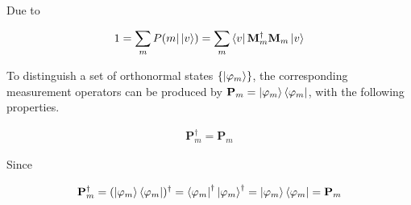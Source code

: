 Due to

\begin{align*}
    1 = \sum\limits_{m} P(m | \ket{v}) = \sum\limits_{m} \bra{v} \mathbf{M}_m^{\dagger} \mathbf{M}_m \ket{v}
\end{align*}


To distinguish a set of orthonormal states $\{\ket{\varphi_m}\}$, the corresponding measurement operators can be produced by $\mathbf{P}_m = \ket{\varphi_m}\bra{\varphi_m}$, with the following properties.

\begin{property}

\begin{align*}
\mathbf{P}_m^{\dagger} = \mathbf{P}_m
\end{align*}

Since

\begin{align*}
\mathbf{P}_m^{\dagger} =
(\ket{\varphi_m}\bra{\varphi_m})^{\dagger} =
\bra{\varphi_m}^{\dagger}\ket{\varphi_m}^{\dagger} =
\ket{\varphi_m}\bra{\varphi_m} =
\mathbf{P}_m
\end{align*}

\end{property}

